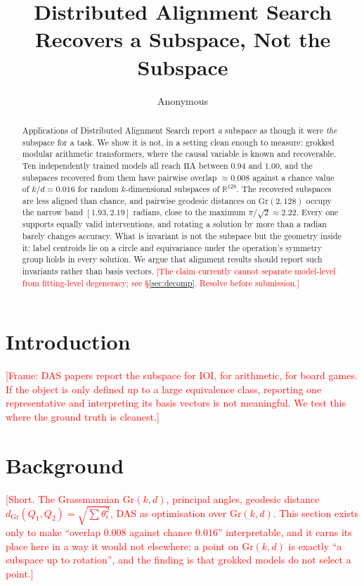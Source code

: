 \documentclass[11pt]{article}
\title{Distributed Alignment Search Recovers a Subspace, Not the Subspace}
\author{Anonymous}
\date{}
\newcommand{\IIA}{\mathrm{IIA}}
\newcommand{\Gr}{\mathrm{Gr}}
\newcommand{\R}{\mathbb{R}}
\newcommand{\dgr}{d_{\Gr}}
\newcommand{\TODO}[1]{\textcolor{red}{[#1]}}
\begin{document}
\linenumbers
\maketitle

\begin{abstract}
Applications of Distributed Alignment Search report \emph{a} subspace as though it
were \emph{the} subspace for a task. We show it is not, in a setting clean enough
to measure: grokked modular arithmetic transformers, where the causal variable is
known and recoverable. Ten independently trained models all reach $\IIA$ between
$0.94$ and $1.00$, and the subspaces recovered from them have pairwise overlap
$\approx 0.008$ against a chance value of $k/d = 0.016$ for random
$k$-dimensional subspaces of $\R^{128}$. The recovered subspaces are less aligned
than chance, and pairwise geodesic distances on $\Gr(2,128)$ occupy the narrow band
$[1.93, 2.19]$ radians, close to the maximum $\pi/\sqrt{2} \approx 2.22$. Every one
supports equally valid interventions, and rotating a solution by more than a
radian barely changes accuracy. What is invariant is not the subspace but the
geometry inside it: label centroids lie on a circle and equivariance under the
operation's symmetry group holds in every solution. We argue that alignment
results should report such invariants rather than basis vectors.
\TODO{The claim currently cannot separate model-level from fitting-level
degeneracy; see \S\ref{sec:decomp}. Resolve before submission.}
\end{abstract}

\section{Introduction}

\TODO{Frame: DAS papers report the subspace for IOI, for arithmetic, for board
games. If the object is only defined up to a large equivalence class, reporting
one representative and interpreting its basis vectors is not meaningful. We test
this where the ground truth is cleanest.}

\section{Background}

\TODO{Short. The Grassmannian $\Gr(k,d)$, principal angles, geodesic distance
$\dgr(Q_1,Q_2) = \sqrt{\sum \theta_i^2}$, DAS as optimisation over $\Gr(k,d)$.
This section exists only to make ``overlap $0.008$ against chance $0.016$''
interpretable, and it earns its place here in a way it would not elsewhere: a
point on $\Gr(k,d)$ is exactly ``a subspace up to rotation'', and the finding is
that grokked models do not select a point.}
\end{document}
